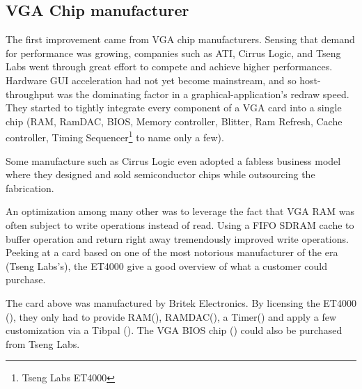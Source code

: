 \subsection{VGA Chip manufacturer}
The first improvement came from VGA chip manufacturers. Sensing that demand for performance was growing, companies such as ATI, Cirrus Logic, and Tseng Labs went through great effort to compete and achieve higher performances. Hardware GUI acceleration had not yet become mainstream, and so host-throughput was the dominating factor in a graphical-application's redraw speed. They started to tightly integrate every component of a VGA card into a single chip (RAM, RamDAC, BIOS, Memory controller, Blitter, Ram Refresh, Cache controller, Timing Sequencer\footnote{Tseng Labs ET4000} to name only a few).\\
\par
Some manufacture such as Cirrus Logic even adopted a fabless business model where they designed and sold semiconductor chips while outsourcing the fabrication.\\
\par
An optimization among many other was to leverage the fact that VGA RAM was often subject to write operations instead of read. Using a FIFO SDRAM cache to buffer operation and return right away tremendously improved write operations. Peeking at a card based on one of the most notorious manufacturer of the era (Tseng Labs's), the ET4000 give a good overview of what a customer could purchase.\\ 
\par
{}
\par
The card above was manufactured by Britek Electronics. By licensing the ET4000 (), they only had to provide RAM(), RAMDAC(), a Timer() and apply a few customization via a Tibpal (). The VGA BIOS chip () could also be purchased from Tseng Labs.\\
\par
{}

\par



